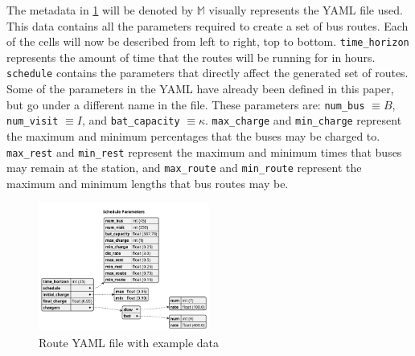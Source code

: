 \documentclass[11pt,a4paper,final]{article}
\newcommand{\M}{\mathbb{M}}                 %
\begin{document}
The metadata in \ref{fig:routeyaml} will be denoted by \(\M\) visually represents the YAML file used. This data contains all the
parameters required to create a set of bus routes. Each of the cells will now be described from left to right, top to
bottom. \texttt{time\_horizon} represents the amount of time that the routes will be running for in hours. \texttt{schedule} contains
the parameters that directly affect the generated set of routes. Some of the parameters in the YAML have already been
defined in this paper, but go under a different name in the file. These parameters are: \texttt{num\_bus} \(\equiv B\),
\texttt{num\_visit} \(\equiv I\), and \texttt{bat\_capacity} \(\equiv \kappa\). \texttt{max\_charge} and \texttt{min\_charge} represent the maximum and
minimum percentages that the buses may be charged to. \texttt{max\_rest} and \texttt{min\_rest} represent the maximum and minimum times
that buses may remain at the station, and \texttt{max\_route} and \texttt{min\_route} represent the maximum and minimum lengths that bus
routes may be.

\begin{figure}[htbp]
\centering
\includegraphics[width=0.5\textwidth]{sections/img/route_yaml.png}
\caption{\label{fig:routeyaml}Route YAML file with example data}
\end{figure}
\end{document}
